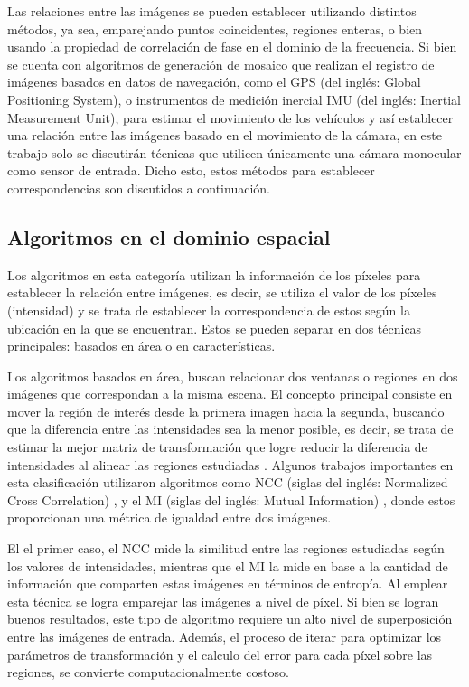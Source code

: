Las relaciones entre las imágenes se pueden establecer utilizando distintos métodos, ya sea, emparejando puntos coincidentes, regiones enteras, o bien usando la propiedad de correlación de fase en el dominio de la frecuencia. Si bien se cuenta con algoritmos de generación de mosaico que realizan el registro de imágenes basados en datos de navegación, como el GPS (del inglés: Global Positioning System), o instrumentos de medición inercial IMU (del inglés: Inertial Measurement Unit), para estimar el movimiento de los vehículos y así establecer una relación entre las imágenes basado en el movimiento de la cámara, en este trabajo solo se discutirán técnicas que utilicen únicamente una cámara monocular como sensor de entrada. Dicho esto, estos métodos para establecer correspondencias son discutidos a continuación.

\subsection*{Algoritmos en el dominio espacial}

Los algoritmos en esta categoría utilizan la información de los píxeles para establecer la relación entre imágenes, es decir, se utiliza el valor de los píxeles (intensidad) y se trata de establecer la correspondencia de estos según la ubicación en la que se encuentran. Estos se pueden separar en dos técnicas principales: basados en área o en características.


Los algoritmos basados en área, buscan relacionar dos ventanas o regiones en dos imágenes que correspondan a la misma escena. El concepto principal consiste en mover la región de interés desde la primera imagen hacia la segunda, buscando que la diferencia entre las intensidades sea la menor posible, es decir,  se trata de estimar la mejor matriz de transformación que logre reducir la diferencia de intensidades al alinear las regiones estudiadas \cite{nccvsmi}. Algunos trabajos importantes en esta clasificación utilizaron algoritmos como NCC (siglas del inglés: Normalized Cross Correlation) \cite{ncc}, y el MI (siglas del inglés: Mutual Information) \cite{mi}, donde estos proporcionan una métrica de igualdad entre dos imágenes.

El el primer caso, el NCC mide la similitud entre las regiones estudiadas según los valores de intensidades, mientras que el MI la mide en base a la cantidad de información que comparten estas imágenes en términos de entropía. Al emplear esta técnica se logra emparejar las imágenes a nivel de píxel. Si bien se logran buenos resultados, este tipo de algoritmo requiere un alto nivel de superposición entre las imágenes de entrada. Además, el proceso de iterar para optimizar los parámetros de transformación y el calculo del error para cada píxel sobre las regiones, se convierte computacionalmente costoso.


